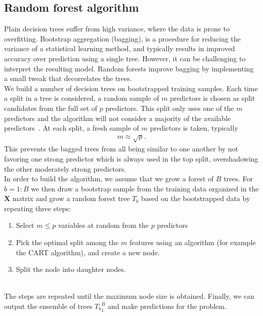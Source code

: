 \documentclass[reprint,english,notitlepage]{revtex4-1}  %
\begin{document}
\subsection{Random forest algorithm}
Plain decision trees suffer from high variance, where the data is prone to overfitting. Bootstrap aggregation (bagging), is a procedure for reducing the variance of a statistical learning method, and typically results in improved accuracy over prediction using a single tree. However, it can be challenging to interpret the resulting model. Random forests improve bagging by implementing a small tweak that decorrelates the trees. 
\vspace{3mm}
\\ 
We build a number of decision trees on bootstrapped training samples. Each time a split in a tree is considered, a random sample of $m$ predictors is chosen as split candidates from the full set of $p$ predictors. This split only uses one of the $m$ predictors and the algorithm will not consider a majority of the available predictors~\cite{morten}. At each split, a fresh sample of $m$ predictors is taken, typically 
\begin{align}
    m \approx \sqrt{p}. 
\end{align}
This prevents the bagged trees from all being similar to one another by not favoring one strong predictor which is always used in the top split, overshadowing the other moderately strong predictors. 
\vspace{3mm}
\\ 
In order to build the algorithm, we assume that we grow a forest of $B$ trees. For $b=1:B$ we then draw a bootstrap sample from the training data organized in the $\mathbf{X}$ matrix and grow a random forest tree $T_b$ based on the bootstrapped data by repeating three steps: 
\begin{enumerate}
    \item Select $m\leq p$ variables at random from the $p$ predictors 
    \item Pick the optimal split among the $m$ features using an algorithm (for example the CART algorithm), and create a new node. 
    \item Split the node into daughter nodes. 
\end{enumerate}
\vspace{3mm}
\\ 
The steps are repeated until the maximum node size is obtained. Finally, we can output the ensemble of trees ${T_b}^B_1$ and make predictions for the problem. 
\end{document}
